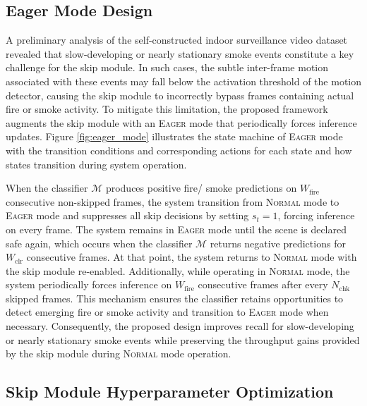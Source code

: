 \documentclass[
  10pt,
]{article}
\begin{document}


\subsection{Eager Mode Design}\label{sec:eagerMode}



A preliminary analysis of the self-constructed indoor surveillance video
dataset revealed that slow-developing or nearly stationary smoke events
constitute a key challenge for the skip module. In such cases, the
subtle inter-frame motion associated with these events may fall below
the activation threshold of the motion detector, causing the skip module
to incorrectly bypass frames containing actual fire or smoke activity.
To mitigate this limitation, the proposed framework augments the skip
module with an \textsc{Eager} mode that periodically forces inference
updates. Figure \ref{fig:eager_mode} illustrates the state machine of
\textsc{Eager} mode with the transition conditions and corresponding
actions for each state and how states transition during system
operation.

When the classifier \(\mathcal{M}\) produces positive fire/ smoke
predictions on \(W_{\text{fire}}\) consecutive non-skipped frames, the
system transition from \textsc{Normal} mode to \textsc{Eager} mode and
suppresses all skip decisions by setting \(s_t = 1\), forcing inference
on every frame. The system remains in \textsc{Eager} mode until the
scene is declared safe again, which occurs when the classifier
\(\mathcal{M}\) returns negative predictions for \(W_{\text{clr}}\)
consecutive frames. At that point, the system returns to \textsc{Normal}
mode with the skip module re-enabled. Additionally, while operating in
\textsc{Normal} mode, the system periodically forces inference on
\(W_{\text{fire}}\) consecutive frames after every \(N_{\text{chk}}\)
skipped frames. This mechanism ensures the classifier retains
opportunities to detect emerging fire or smoke activity and transition
to \textsc{Eager} mode when necessary. Consequently, the proposed design
improves recall for slow-developing or nearly stationary smoke events
while preserving the throughput gains provided by the skip module during
\textsc{Normal} mode operation.

\subsection{Skip Module Hyperparameter
Optimization}\label{sec:hyperparam}
\end{document}

